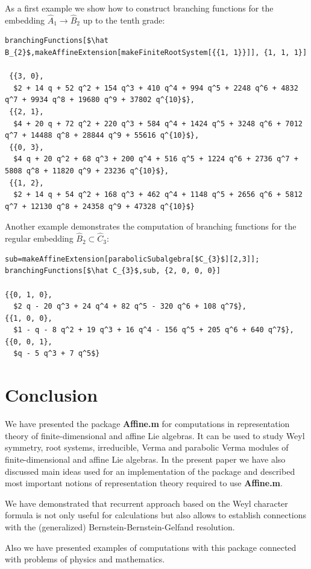 As a first example we show how to construct branching functions for the embedding $\hat A_{1}\to \hat B_{2}$ up to the tenth grade:
\begin{lstlisting}[mathescape=true]
branchingFunctions[$\hat B_{2}$,makeAffineExtension[makeFiniteRootSystem[{{1, 1}}]], {1, 1, 1}]

 {{3, 0}, 
  $2 + 14 q + 52 q^2 + 154 q^3 + 410 q^4 + 994 q^5 + 2248 q^6 + 4832 q^7 + 9934 q^8 + 19680 q^9 + 37802 q^{10}$},
 {{2, 1}, 
  $4 + 20 q + 72 q^2 + 220 q^3 + 584 q^4 + 1424 q^5 + 3248 q^6 + 7012 q^7 + 14488 q^8 + 28844 q^9 + 55616 q^{10}$},
 {{0, 3}, 
  $4 q + 20 q^2 + 68 q^3 + 200 q^4 + 516 q^5 + 1224 q^6 + 2736 q^7 + 5808 q^8 + 11820 q^9 + 23236 q^{10}$},
 {{1, 2}, 
  $2 + 14 q + 54 q^2 + 168 q^3 + 462 q^4 + 1148 q^5 + 2656 q^6 + 5812 q^7 + 12130 q^8 + 24358 q^9 + 47328 q^{10}$}
\end{lstlisting}

Another example demonstrates the computation of branching functions for the regular embedding $\hat B_{2}\subset \hat C_{3}$:
\begin{lstlisting}[mathescape=true]
sub=makeAffineExtension[parabolicSubalgebra[$C_{3}$][2,3]];
branchingFunctions[$\hat C_{3}$,sub, {2, 0, 0, 0}]

{{0, 1, 0}, 
  $2 q - 20 q^3 + 24 q^4 + 82 q^5 - 320 q^6 + 108 q^7$}, 
{{1, 0, 0}, 
  $1 - q - 8 q^2 + 19 q^3 + 16 q^4 - 156 q^5 + 205 q^6 + 640 q^7$}, 
{{0, 0, 1}, 
  $q - 5 q^3 + 7 q^5$}
\end{lstlisting}

\section{Conclusion}
\label{sec:conclusion}
We have presented the package {\bf Affine.m} for computations in representation theory of finite-dimensional and affine Lie algebras. It can be used to study Weyl symmetry, root systems, irreducible, Verma and parabolic Verma modules of finite-dimensional and affine Lie algebras.  In the present paper we have also discussed main ideas used for an implementation of the package and described most important notions of representation theory required to use {\bf Affine.m}. 

We have demonstrated that recurrent approach based on the Weyl character formula is not only useful for calculations but also allows to establish connections with the (generalized) Bernstein-Bernstein-Gelfand resolution. 

Also we have presented examples of computations with this package connected with problems of physics and mathematics. 

